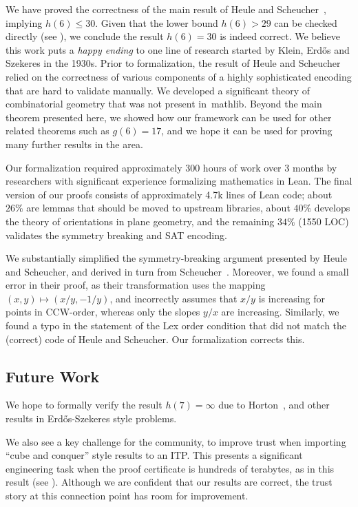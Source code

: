 We have proved the correctness of the main result of Heule and Scheucher~\cite{emptyHexagonNumber},
implying $h(6) \leq 30$.
Given that the lower bound $h(6) > 29$ can be checked directly (see \cite{emptyHexagonNumber}),
we conclude the result $h(6) = 30$ is indeed correct.
We believe this work puts a \emph{happy ending} to
one line of research started by Klein, Erd\H{o}s and Szekeres in the 1930s.
Prior to formalization, the result of Heule and Scheucher
relied on the correctness of various components of a highly sophisticated encoding
that are hard to validate manually.
We developed a significant theory of combinatorial geometry
that was not present in~\textsf{mathlib}.
Beyond the main theorem presented here,
we showed how our framework can be used for other related theorems
such as $g(6) = 17$,
and we hope it can be used for proving many further results in the area.

Our formalization required approximately 300 hours of work over 3 months
by researchers with significant experience formalizing mathematics in Lean.
The final version of our proofs consists of approximately 4.7k lines of Lean code;
about $26\%$ are lemmas that should be moved to upstream libraries,
about $40\%$ develops the theory of orientations in plane geometry,
and the remaining $34\%$ (1550 LOC) validates the symmetry breaking and SAT encoding.

We substantially simplified the symmetry-breaking argument presented by Heule and Scheucher,
and derived in turn from Scheucher~\cite{scheucherTwoDisjoint5holes2020}.
Moreover, we found a small error in their proof,
as their transformation uses the mapping $(x, y) \mapsto (x/y, -1/y)$,
and incorrectly assumes that $x/y$ is increasing for points in CCW-order,
whereas only the slopes $y/x$ are increasing.
Similarly, we found a typo in the statement of the \textsf{Lex order} condition
that did not match the (correct) code of Heule and Scheucher.
Our formalization corrects this.

\subsection*{Future Work}
We hope to formally verify the result $h(7) = \infty$ due to Horton~\cite{hortonSetsNoEmpty1983},
and other results in Erd\H{o}s-Szekeres style problems.

We also see a key challenge for the community,
to improve trust when importing ``cube and conquer'' style results to an ITP.
This presents a significant engineering task
when the proof certificate is hundreds of terabytes,
as in this result (see ).
Although we are confident that our results are correct,
the trust story at this connection point has room for improvement.
